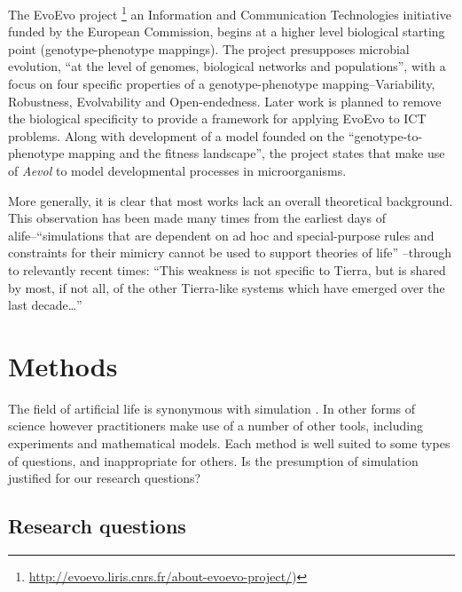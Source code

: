\begin{NOTES}
The EvoEvo project \footnote{\url{http://evoevo.liris.cnrs.fr/about-evoevo-project/})} an Information and Communication Technologies initiative funded by the European Commission, begins at a higher level biological starting point (genotype-phenotype mappings). The project presupposes microbial evolution, ``at the level of genomes, biological networks and populations'', with a focus on four specific properties of a genotype-phenotype mapping--Variability, Robustness, Evolvability and Open-endedness. Later work is planned to remove the biological specificity to provide a framework for applying EvoEvo to ICT problems. Along with development of a model founded on the ``genotype-to-phenotype mapping and the fitness landscape'', the project states that make use of \emph{Aevol} \parencite{Knibbe:2006vn,Knibbe:2007kx} to model developmental processes in microorganisms.

More generally, it is clear that most works lack an overall theoretical background. This observation has been made many times from the earliest days of \gls{alife}--``simulations that are dependent on ad hoc and special-purpose rules and constraints for their mimicry cannot be used to support theories of life''  \parencite{Pattee1988}--through to relevantly recent times: ``This weakness is not specific to Tierra, but is shared by most, if not all, of the other Tierra-like systems which have emerged over the last decade\ldots{}'' \parencite{Taylor2001}
\end{NOTES}

\chapter{Methods}\label{methods}

The field of artificial life is synonymous with simulation \parencite[chap.2]{Aicardi2010}. In other forms of science however practitioners make use of a number of other tools, including experiments and mathematical models. Each method is well suited to some types of questions, and inappropriate for others. Is the presumption of simulation justified for our research questions?

\section{Research questions}\label{research-questions}

